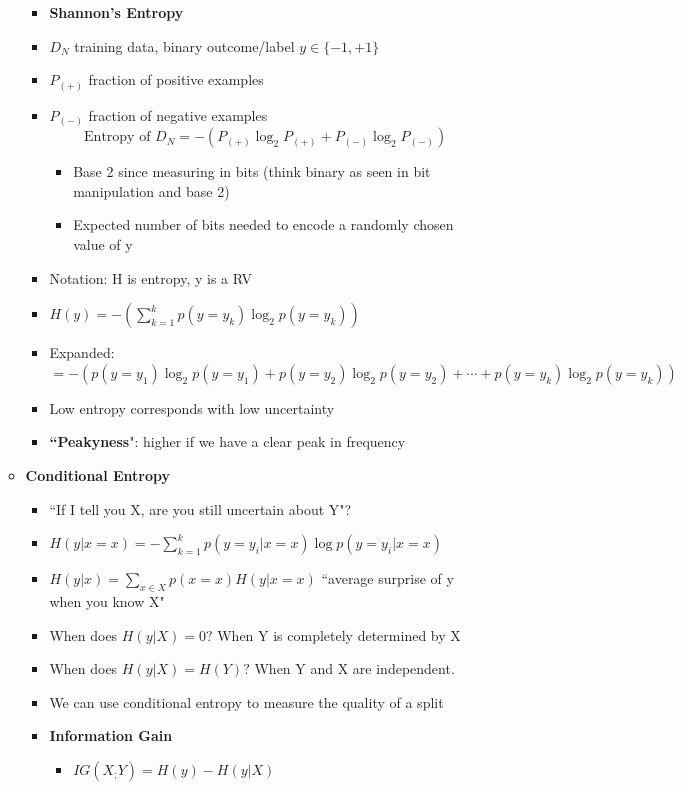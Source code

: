 \documentclass[10pt, oneside]{article}
\begin{document}
\begin{itemize}
\begin{itemize}
\begin{itemize}
            \item \textbf{Shannon's Entropy}
            \item $D_N$ training data, binary outcome/label $y\in\{-1,+1\}$
            \item $P_{(+)}$ fraction of positive examples
            \item $P_{(-)}$ fraction of negative examples\[\text{Entropy of }D_N = -(P_{(+)} \log_2 P_{(+)} + P_{(-)} \log_2P_{(-)})\]
            \begin{itemize}
                \item Base 2 since measuring in bits (think binary as seen in bit manipulation and base 2)
                \item Expected number of bits needed to encode a randomly chosen value of y
            \end{itemize}
            \item Notation: H is entropy, y is a RV
            \item $H(y) = -\left(\sum_{k=1}^k p(y=y_k) \log_2 p(y=y_k)\right)$
            \item Expanded: $=-\left(p(y=y_1)\log_2p(y=y_1) + p(y=y_2) \log_2 p(y=y_2) + \cdots + p(y=y_k)\log_2p(y=y_k)\right)$
            \item Low entropy corresponds with low uncertainty
            \item \textbf{``Peakyness}": higher if we have a clear peak in frequency
        \end{itemize}
        \item \textbf{Conditional Entropy}
        \begin{itemize}
            \item ``If I tell you X, are you still uncertain about Y"?
            \item $H(y|x=x) = -\sum_{k=1} ^k p(y=y_i | x=x) \log p(y=y_i | x=x)$
            \item $H(y|x) = \sum_{x\in X} p(x=x) H(y|x=x)$ ``average surprise of y when you know X"
            \item When does $H(y|X) = 0?$ When Y is completely determined by X
            \item When does $H(y|X) = H(Y)?$ When Y and X are independent.
            \item We can use conditional entropy to measure the quality of a split
            \item \textbf{Information Gain}
            \begin{itemize}
                \item $IG(X_;Y) = H(y)-H(y|X)$

\end{itemize}
\end{itemize}
\end{itemize}
\end{itemize}
\end{document}
